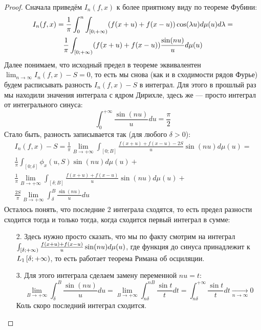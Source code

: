 \begin{proof}
	Сначала приведём $I_n(f, x)$ к более приятному виду по теореме Фубини:
	\begin{multline*}
		I_n(f, x) = \frac{1}{\pi} \int_0^n \int_{\left[0; +\infty\right)} (f(x + u) + f(x - u))\cos(\lambda u)d\mu(u)d\lambda =
		\\
		\frac{1}{\pi} \int_{\left[0; +\infty\right)} (f(x + u) + f(x - u)) \frac{\sin(nu)}{u}d\mu(u)
	\end{multline*}
	Далее понимаем, что исходный предел в теореме эквивалентен $\lim_{n \to \infty} I_n(f, x) - S = 0$, то есть мы снова (как и в сходимости рядов Фурье) будем расписывать разность $I_n(f, x) - S$ в интеграл. Для этого в прошлый раз мы находили значения интеграла с ядром Дирихле, здесь же --- просто интеграл от интегрального синуса:
	\[
		\int_0^{+\infty} \frac{\sin(nu)}{u}du = \frac{\pi}{2}
	\]
	Стало быть, разность записывается так (для любого $\delta > 0$):
	\begin{multline*}
		I_n(f, x) - S = \frac{1}{\pi} \lim_{B \to +\infty} \int_{[0; B]} \frac{f(x + u) + f(x - u) - 2S}{u}\sin(nu)d\mu(u) =
		\\
		\frac{1}{\pi} \int_{[0; \delta]} \phi_x(u, S)\sin(nu)d\mu(u) +
		\\
		\frac{1}{\pi} \lim_{B \to +\infty} \int_{[\delta; B]} \frac{f(x + u) + f(x - u)}{u}\sin(nu)d\mu(u) +
		\\
		\frac{2S}{\pi} \lim_{B \to +\infty} \int_\delta^B \frac{\sin(nu)}{u}du
	\end{multline*}
	Осталось понять, что последние 2 интеграла сходятся, то есть предел разности сходится тогда и только тогда, когда сходится первый интеграл в сумме:
	\begin{enumerate}
		\item[2.] Здесь нужно просто сказать, что мы по факту смотрим на интеграл \\ $\int_{\left[\delta; +\infty\right)} \frac{f(x + u) + f(x - u)}{u} \sin(nu)d\mu(u)$, где функция до синуса принадлежит к $L_1\left[\delta; +\infty\right)$, то есть работает теорема Римана об осциляции.
		
		\item[3.] Для этого интеграла сделаем замену переменной $nu = t$:
		\[
			\lim_{B \to +\infty} \int_{\delta}^B \frac{\sin(nu)}{u}du = \lim_{B \to +\infty} \int_{n\delta}^{nB} \frac{\sin t}{t}dt = \int_{n\delta}^{+\infty} \frac{\sin t}{t}dt \xrightarrow[n \to \infty]{} 0
		\]
		Коль скоро последний интеграл сходится.
	\end{enumerate}
\end{proof}

